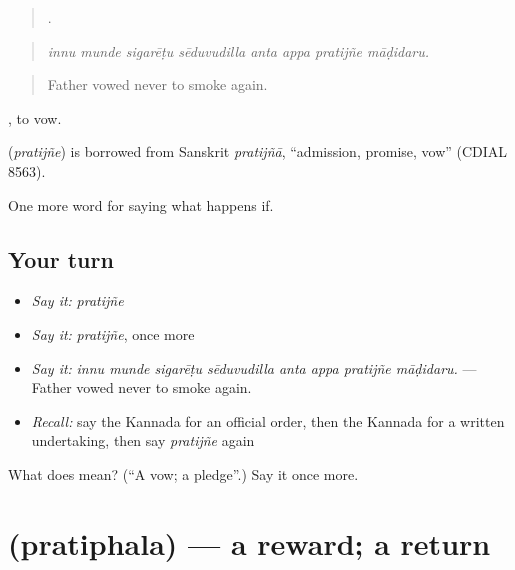 \begin{quote}
       .
\end{quote}

\begin{quote}
\emph{innu munde sigarēṭu sēduvudilla anta appa pratijñe māḍidaru.}
\end{quote}

\begin{quote}
Father vowed never to smoke again.
\end{quote}

 , to vow.

\begin{cousinweb}
\textbf{} (\emph{pratijñe}) is borrowed from Sanskrit \emph{pratijñā}, \textquotedblleft{}admission, promise, vow\textquotedblright{} (CDIAL 8563).
\end{cousinweb}

\begin{grammarlens}[title={What you've built}]
One more word for saying what happens if.
\end{grammarlens}

\subsection*{Your turn}
\begin{itemize}
\raggedright
  \item \emph{Say it:} \emph{pratijñe}
  \item \emph{Say it:} \emph{pratijñe}, once more
  \item \emph{Say it:} \emph{innu munde sigarēṭu sēduvudilla anta appa pratijñe māḍidaru.} — Father vowed never to smoke again.
  \item \emph{Recall:} say the Kannada for an official order, then the Kannada for a written undertaking, then say \emph{pratijñe} again
\end{itemize}

\begin{tcolorbox}[breakable,colback=teal!4,colframe=teal!35!black,title={Before you move on}]
What does  mean? (\textquotedblleft{}A vow; a pledge\textquotedblright{}.) Say it once more.
\end{tcolorbox}
\section[\texorpdfstring{\kn{ಪ್ರತಿಫಲ} (pratiphala)}{ಪ್ರತಿಫಲ (pratiphala)}]{ (pratiphala) — a reward; a return}

